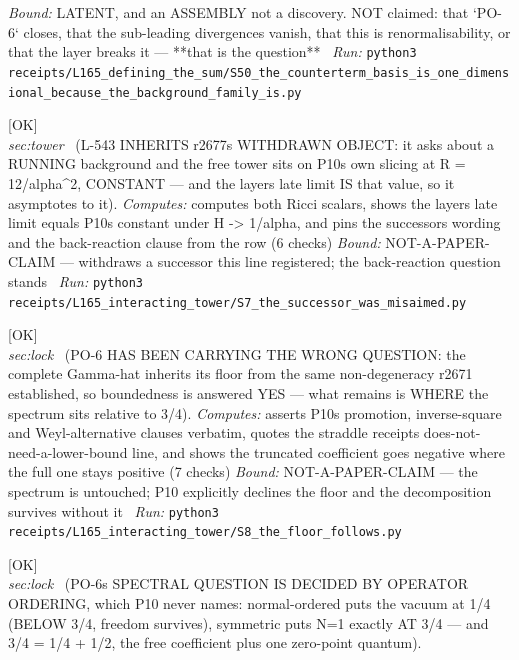 \begin{description}
 \emph{Bound:} LATENT, and an ASSEMBLY not a discovery. NOT claimed: that `PO-6` closes, that the sub-leading divergences vanish, that this is renormalisability, or that the layer breaks it --- **that is the question**
\ \emph{Run:} \texttt{python3 receipts/L165\_defining\_the\_sum/S50\_the\_counterterm\_basis\_is\_one\_dimensional\_because\_the\_background\_family\_is.py}
\item[\label{rcpt:S7_the_successor_was_misaimed}\textbf{}\quad\texttt{S7\_the\_successor\_was\_misaimed}]\hfill\textsf{[OK]}\\
\textit{sec:tower} \ (L-543 INHERITS r2677s WITHDRAWN OBJECT: it asks about a RUNNING background and the free tower sits on P10s own slicing at R = 12/alpha\textasciicircum{}2, CONSTANT --- and the layers late limit IS that value, so it asymptotes to it). 
\emph{Computes:} computes both Ricci scalars, shows the layers late limit equals P10s constant under H -> 1/alpha, and pins the successors wording and the back-reaction clause from the row (6 checks)
 \emph{Bound:} NOT-A-PAPER-CLAIM --- withdraws a successor this line registered; the back-reaction question stands
\ \emph{Run:} \texttt{python3 receipts/L165\_interacting\_tower/S7\_the\_successor\_was\_misaimed.py}
\item[\label{rcpt:S8_the_floor_follows}\textbf{}\quad\texttt{S8\_the\_floor\_follows}]\hfill\textsf{[OK]}\\
\textit{sec:lock} \ (PO-6 HAS BEEN CARRYING THE WRONG QUESTION: the complete Gamma-hat inherits its floor from the same non-degeneracy r2671 established, so boundedness is answered YES --- what remains is WHERE the spectrum sits relative to 3/4). 
\emph{Computes:} asserts P10s promotion, inverse-square and Weyl-alternative clauses verbatim, quotes the straddle receipts does-not-need-a-lower-bound line, and shows the truncated coefficient goes negative where the full one stays positive (7 checks)
 \emph{Bound:} NOT-A-PAPER-CLAIM --- the spectrum is untouched; P10 explicitly declines the floor and the decomposition survives without it
\ \emph{Run:} \texttt{python3 receipts/L165\_interacting\_tower/S8\_the\_floor\_follows.py}
\item[\label{rcpt:S9_the_ordering_decides_it}\textbf{}\quad\texttt{S9\_the\_ordering\_decides\_it}]\hfill\textsf{[OK]}\\
\textit{sec:lock} \ (PO-6s SPECTRAL QUESTION IS DECIDED BY OPERATOR ORDERING, which P10 never names: normal-ordered puts the vacuum at 1/4 (BELOW 3/4, freedom survives), symmetric puts N=1 exactly AT 3/4 --- and 3/4 = 1/4 + 1/2, the free coefficient plus one zero-point quantum). 

\end{description}

